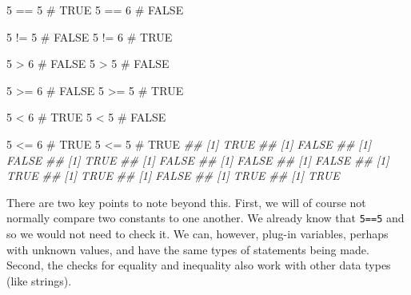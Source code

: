 \documentclass[
  letterpaper,
  DIV=11,
  numbers=noendperiod]{scrreprt}
\newenvironment{Shaded}{\begin{snugshade}}{\end{snugshade}}
\newcommand{\CommentTok}[1]{\textcolor[rgb]{0.37,0.37,0.37}{#1}}
\newcommand{\DecValTok}[1]{\textcolor[rgb]{0.68,0.00,0.00}{#1}}
\newcommand{\DocumentationTok}[1]{\textcolor[rgb]{0.37,0.37,0.37}{\textit{#1}}}
\newcommand{\SpecialCharTok}[1]{\textcolor[rgb]{0.37,0.37,0.37}{#1}}
\theoremstyle{definition}
\theoremstyle{definition}
\theoremstyle{definition}
\theoremstyle{remark}
\begin{document}
\begin{Shaded}
\begin{Highlighting}[]
\DecValTok{5} \SpecialCharTok{==} \DecValTok{5} \CommentTok{\# TRUE}
\DecValTok{5} \SpecialCharTok{==} \DecValTok{6} \CommentTok{\# FALSE}

\DecValTok{5} \SpecialCharTok{!=} \DecValTok{5} \CommentTok{\# FALSE }
\DecValTok{5} \SpecialCharTok{!=} \DecValTok{6} \CommentTok{\# TRUE }

\DecValTok{5} \SpecialCharTok{\textgreater{}} \DecValTok{6} \CommentTok{\# FALSE}
\DecValTok{5} \SpecialCharTok{\textgreater{}} \DecValTok{5} \CommentTok{\# FALSE}

\DecValTok{5} \SpecialCharTok{\textgreater{}=} \DecValTok{6} \CommentTok{\# FALSE}
\DecValTok{5} \SpecialCharTok{\textgreater{}=} \DecValTok{5} \CommentTok{\# TRUE}

\DecValTok{5} \SpecialCharTok{\textless{}} \DecValTok{6} \CommentTok{\# TRUE}
\DecValTok{5} \SpecialCharTok{\textless{}} \DecValTok{5} \CommentTok{\# FALSE }

\DecValTok{5} \SpecialCharTok{\textless{}=} \DecValTok{6} \CommentTok{\# TRUE }
\DecValTok{5} \SpecialCharTok{\textless{}=} \DecValTok{5} \CommentTok{\# TRUE }
\DocumentationTok{\#\# [1] TRUE}
\DocumentationTok{\#\# [1] FALSE}
\DocumentationTok{\#\# [1] FALSE}
\DocumentationTok{\#\# [1] TRUE}
\DocumentationTok{\#\# [1] FALSE}
\DocumentationTok{\#\# [1] FALSE}
\DocumentationTok{\#\# [1] FALSE}
\DocumentationTok{\#\# [1] TRUE}
\DocumentationTok{\#\# [1] TRUE}
\DocumentationTok{\#\# [1] FALSE}
\DocumentationTok{\#\# [1] TRUE}
\DocumentationTok{\#\# [1] TRUE}
\end{Highlighting}
\end{Shaded}

There are two key points to note beyond this. First, we will of course
not normally compare two constants to one another. We already know that
\texttt{5==5} and so we would not need to check it. We can, however,
plug-in variables, perhaps with unknown values, and have the same types
of statements being made. Second, the checks for equality and inequality
also work with other data types (like strings).
\end{document}
